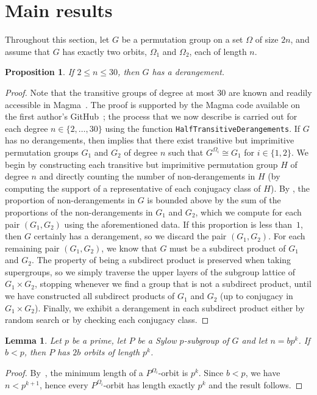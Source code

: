\documentclass[11pt,a4paper]{amsart}
\newtheorem{proposition}[theorem]{Proposition}
\newtheorem{lemma}[theorem]{Lemma}
\theoremstyle{definition}
\begin{document}
\section{Main results}
Throughout this section, let $G$ be a permutation group on a set $\Omega$ of size $2n$, and assume that $G$ has exactly two orbits, $\Omega_1$ and $\Omega_2$, each of length $n$. 

\begin{proposition}\label{computations}
If $2\leq n\leq 30$, then $G$ has a derangement.
\end{proposition}

\begin{proof}
Note that the transitive groups of degree at most $30$ are known \cite{MR2168238} and readily accessible in Magma~\cite{magma}. The proof is supported by the Magma code available on the first author's GitHub~\cite{mel_github}; the process that we now describe is carried out for each degree $n \in \{2,\dots,30\}$ using the function \texttt{HalfTransitiveDerangements}. If $G$ has no derangements, then \cite[Corollary~4]{harper_ellis} implies that there exist transitive but imprimitive permutation groups $G_1$ and $G_2$ of degree $n$ such that $G^{\Omega_i} \cong G_1$ for $i \in \{1,2\}$. We begin by constructing each transitive but imprimitive permutation group $H$ of degree $n$ and directly counting the number of non-derangements in $H$ (by computing the support of a representative of each conjugacy class of $H$). By , the proportion of non-derangements in $G$ is bounded above by the sum of the proportions of the non-derangements in $G_1$ and $G_2$, which we compute for each pair $(G_1,G_2)$ using the aforementioned data. If this proportion is less than~$1$, then $G$ certainly has a derangement, so we discard the pair $(G_1,G_2)$. For each remaining pair $(G_1,G_2)$, we know that $G$ must be a subdirect product of $G_1$ and $G_2$. The property of being a subdirect product is preserved when taking supergroups, so we simply traverse the upper layers of the subgroup lattice of $G_1 \times G_2$, stopping whenever we find a group that is not a subdirect product, until we have constructed all subdirect products of $G_1$ and $G_2$ (up to conjugacy in $G_1\times G_2$). Finally, we exhibit a derangement in each subdirect product either by random search or by checking each conjugacy class. 
\end{proof}


\begin{lemma}\label{SameSizeOrbits}
Let $p$ be a prime, let $P$ be a Sylow $p$-subgroup of $G$ and let $n=bp^k$. If $b<p$, then $P$ has $2b$ orbits of length $p^k$.
\end{lemma}
\begin{proof}
By~, the minimum length of a $P^{\Omega_i}$-orbit is $p^k$. Since $b<p$, we have $n<p^{k+1}$, hence every $P^{\Omega_i}$-orbit has length exactly $p^k$ and the result follows.
\end{proof}
\end{document}
